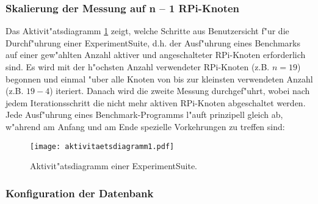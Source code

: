 \subsubsection{Skalierung der Messung auf n -- 1 RPi-Knoten} 

Das Aktivit"atsdiagramm \ref{fig:Aktivitaetsdiagramm} zeigt, welche Schritte aus Benutzersicht f"ur die Durchf"uhr\-ung einer ExperimentSuite, d.h. der Ausf"uhrung eines Benchmarks auf einer gew"ahlten Anzahl aktiver und angeschalteter RPi-Knoten erforderlich sind. Es wird mit der h"ochsten Anzahl verwendeter RPi-Knoten (z.B. $n=19$) begonnen und einmal "uber alle Knoten von bis zur kleinsten verwendeten Anzahl (z.B. $19-4$) iteriert. Danach wird die zweite Messung durchgef"uhrt, wobei nach jedem Iterationsschritt die nicht mehr aktiven RPi-Knoten abgeschaltet werden. Jede Ausf"uhrung eines Benchmark-Programms l"auft prinzipell gleich ab, w"ahrend am Anfang und am Ende spezielle Vorkehrungen zu treffen sind:  
\begin{figure}[htb]
  \centerline{\texttt{[image: aktivitaetsdiagramm1.pdf]}} 
  \caption{Aktivit"atsdiagramm einer ExperimentSuite.}
  \label{fig:Aktivitaetsdiagramm}
\end{figure}

\subsubsection{Konfiguration der Datenbank}

